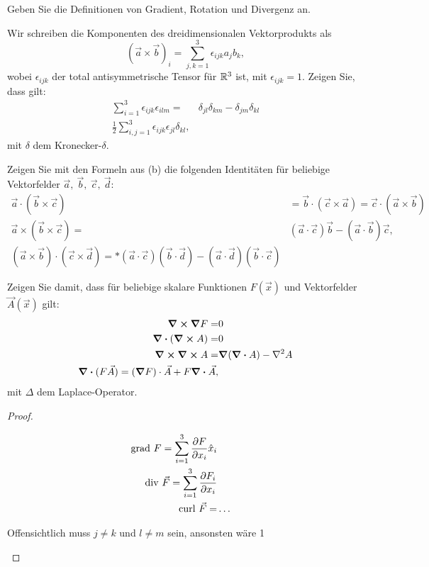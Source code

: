\begin{Problem}
	\begin{parts}
		\item Geben Sie die Definitionen von Gradient, Rotation und Divergenz an.
		\item Wir schreiben die Komponenten des dreidimensionalen Vektorprodukts als
			\[
				(\vec{a}\times \vec{b})_i=\sum_{j,k=1}^3 \epsilon_{ijk}a_jb_k,\] 
				wobei $\epsilon_{ijk}$ der total antisymmetrische Tensor f\"{u}r $\mathbb{R}^3$ ist, mit $\epsilon_{ijk}=1$. Zeigen Sie, dass gilt:
				\begin{align*}
					\sum_{i=1}^3 \epsilon_{ijk}\epsilon_{ilm}=&\delta_{jl}\delta_{km}-\delta_{jm}\delta_{kl}\\
					\frac{1}{2}\sum_{i,j=1}^3 \epsilon_{ijk}\epsilon_{jl}\delta_{kl},
				\end{align*}
				mit $\delta$ dem Kronecker-$\delta$.
			\item Zeigen Sie mit den Formeln aus (b) die folgenden Identitäten für beliebige Vektorfelder $\vec{a},~\vec{b},~\vec{c},~\vec{d}$:
				\begin{align*}
					\vec{a}\cdot(\vec{b}\times\vec{c})&=\vec{b}\cdot (\vec{c}\times \vec{a})=\vec{c}\cdot (\vec{a}\times \vec{b})\\
					\vec{a}\times(\vec{b}\times\vec{c})=&(\vec{a}\cdot\vec{c})\vec{b}-(\vec{a}\cdot\vec{b})\vec{c},\\
					(\vec{a}\times\vec{b})\cdot(\vec{c}\times\vec{d})=*(\vec{a}\cdot\vec{c})(\vec{b}\cdot\vec{d})-(\vec{a}\cdot\vec{d})(\vec{b}\cdot\vec{c})
				\end{align*}
			\item Zeigen Sie damit, dass f\"{u}r beliebige skalare Funktionen $F(\vec{x})$ und Vektorfelder $\vec{A}(\vec{x})$ gilt:
				\begin{align*}
					\curl{\grad{F}}=&0\\
					\div{(\curl{A})}=&0\\
					\curl{\curl{A}}=&\grad{(\div{A})}-\laplacian{A}\\
					\div{(F\vec{A})}=(\grad{F})\cdot\vec{A}+F\div{\vec{A}},
				\end{align*}
				mit $\Delta$ dem Laplace-Operator.
	\end{parts}
\end{Problem} 
\begin{proof}
	\begin{parts}
	\item 
		\begin{align*}
			\text{grad }F=\sum_{i=1}^3 \pdv{F}{x_i}\hat{x}_i\\
			\text{div }\vec{F}=\sum_{i=1}^3 \pdv{F_i}{x_i}\\
			\text{curl }\vec{F}=&\ldots
		\end{align*}
	\item Offensichtlich muss $j\neq k$ und $l\neq m$ sein, ansonsten wäre 1
	\end{parts}
\end{proof}
\begin{Problem}
	
\end{Problem}
